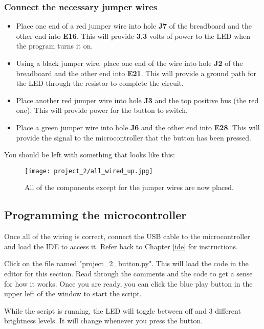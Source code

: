 \subsubsection{Connect the necessary jumper wires}
\begin{itemize}
    \item Place one end of a red jumper wire into hole \textbf{J7} of the breadboard and the other end into
    \textbf{E16}. This will provide \textbf{3.3} volts of power to the LED when the program turns it on.
    \item Using a black jumper wire, place one end of the wire into hole \textbf{J2} of the breadboard and the other
    end into \textbf{E21}. This will provide a ground path for the LED through the resistor to complete the circuit.
    \item Place another red jumper wire into hole \textbf{J3} and the top positive bus (the red one). This will
    provide power for the button to switch.
    \item Place a green jumper wire into hole \textbf{J6} and the other end into \textbf{E28}. This
    will provide the signal to the microcontroller that the button has been pressed.
\end{itemize}

You should be left with something that looks like this:
\begin{figure}[H]
    \centering
    \texttt{[image: project\_2/all\_wired\_up.jpg]}
    \caption{All of the components except for the jumper wires are now placed.}
\end{figure}

\subsection{Programming the microcontroller}

Once all of the wiring is correct, connect the USB cable to the microcontroller and load the IDE to
access it. Refer back to Chapter \ref{ide} for instructions.

Click on the file named "project\_2\_button.py". This will load the code in the editor for this section.
Read through the comments and the code to get a sense for how it works. Once you are ready, you can
click the blue play button in the upper left of the window to start the script.

While the script is running, the LED will toggle between off and 3 different brightness levels. It will
change whenever you press the button.

